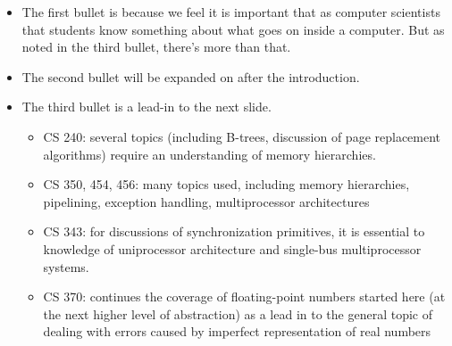 \begin{frame}[fragile]
\begin{itemize}
\item The first bullet is because we feel it is important that
	as computer scientists that students know something about
	what goes on inside a computer.  But as noted in the third
	bullet, there's more than that.
\item The second bullet will be expanded on after the introduction.
\item The third bullet is a lead-in to the next slide.

\begin{itemize}
\item CS 240: several topics (including B-trees, discussion of page
	replacement algorithms) require an understanding of memory
	hierarchies. 
\item CS 350, 454, 456: many topics used, including memory hierarchies,
	pipelining, exception handling, multiprocessor architectures
\item CS 343: for discussions of synchronization primitives, it is essential to knowledge of uniprocessor architecture and
	single-bus multiprocessor systems.
\item CS 370: continues the coverage of floating-point numbers started
	here (at the next higher level of abstraction) as a lead in to
	the general topic of dealing with errors caused by imperfect
	representation of real numbers
\end{itemize}
\end{itemize}

\fi

\ENotes
\end{frame}




